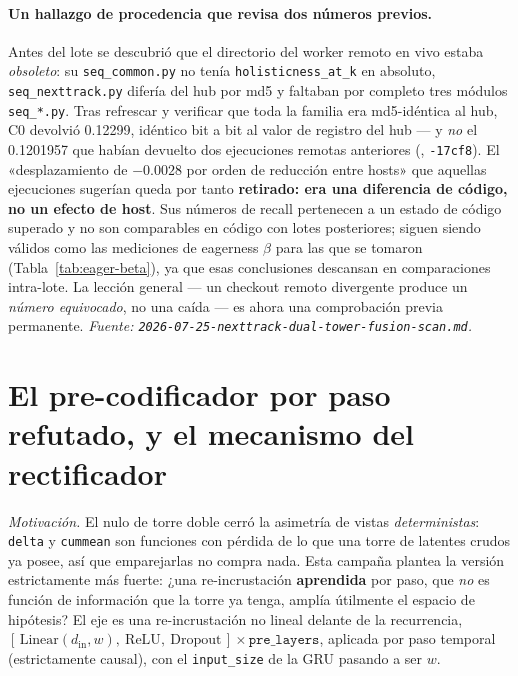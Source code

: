 \documentclass[11pt]{article}
\newcommand{\runid}[1]{\texttt{\small\seqsplit{#1}}}
\begin{document}
\paragraph{Un hallazgo de procedencia que revisa dos números previos.} Antes del
lote se descubrió que el directorio del worker remoto en vivo estaba
\emph{obsoleto}: su \texttt{seq\_common.py} no tenía \texttt{holisticness\_at\_k}
en absoluto, \texttt{seq\_nexttrack.py} difería del hub por md5 y faltaban por
completo tres módulos \texttt{seq\_*.py}. Tras refrescar y verificar que toda la
familia era md5-idéntica al hub, C0 devolvió \num{0.12299}, idéntico bit a bit al
valor de registro del hub --- y \emph{no} el \num{0.1201957} que habían devuelto
dos ejecuciones remotas anteriores (\runid{run-20260723-002044-af11a},
\texttt{-17cf8}). El «desplazamiento de $-\num{0.0028}$ por orden de reducción
entre hosts» que aquellas ejecuciones sugerían queda por tanto
\textbf{retirado: era una diferencia de código, no un efecto de host}. Sus
números de recall pertenecen a un estado de código superado y no son comparables
en código con lotes posteriores; siguen siendo válidos como las mediciones de
eagerness $\beta$ para las que se tomaron (Tabla~\ref{tab:eager-beta}), ya que
esas conclusiones descansan en comparaciones intra-lote. La lección general ---
un checkout remoto divergente produce un \emph{número equivocado}, no una caída
--- es ahora una comprobación previa permanente.
\emph{Fuente: \texttt{2026-07-25-nexttrack-dual-tower-fusion-scan.md}.}

\section{El pre-codificador por paso refutado, y el mecanismo del rectificador}
\label{sec:preencoder}
\emph{Motivación.} El nulo de torre doble cerró la asimetría de vistas
\emph{deterministas}: \texttt{delta} y \texttt{cummean} son funciones con pérdida
de lo que una torre de latentes crudos ya posee, así que emparejarlas no compra
nada. Esta campaña plantea la versión estrictamente más fuerte: ¿una
re-incrustación \textbf{aprendida} por paso, que \emph{no} es función de
información que la torre ya tenga, amplía útilmente el espacio de hipótesis? El
eje es una re-incrustación no lineal delante de la recurrencia,
$[\,\text{Linear}(d_{\text{in}},w),\ \text{ReLU},\ \text{Dropout}\,]\times
\texttt{pre\_layers}$, aplicada por paso temporal (estrictamente causal), con el
\texttt{input\_size} de la GRU pasando a ser $w$.
\end{document}
